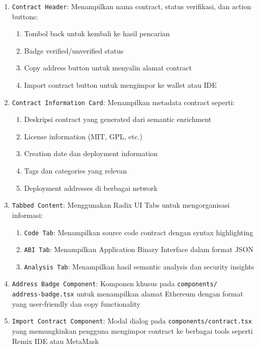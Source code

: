 \begin{enumerate}
	\item \texttt{Contract Header}: Menampilkan nama contract, status verifikasi, dan action buttons:
	      \begin{enumerate}
		      \item Tombol back untuk kembali ke hasil pencarian
		      \item Badge verified/unverified status
		      \item Copy address button untuk menyalin alamat contract
		      \item Import contract button untuk mengimpor ke wallet atau IDE
	      \end{enumerate}
	\item \texttt{Contract Information Card}: Menampilkan metadata contract seperti:
	      \begin{enumerate}
		      \item Deskripsi contract yang generated dari semantic enrichment
		      \item License information (MIT, GPL, etc.)
		      \item Creation date dan deployment information
		      \item Tags dan categories yang relevan
		      \item Deployment addresses di berbagai network
	      \end{enumerate}
	\item \texttt{Tabbed Content}: Menggunakan Radix UI Tabs untuk mengorganisasi informasi:
	      \begin{enumerate}
		      \item \texttt{Code Tab}: Menampilkan source code contract dengan syntax highlighting
		      \item \texttt{ABI Tab}: Menampilkan Application Binary Interface dalam format JSON
		      \item \texttt{Analysis Tab}: Menampilkan hasil semantic analysis dan security insights
	      \end{enumerate}
	\item \texttt{Address Badge Component}: Komponen khusus pada \texttt{components/\\address-badge.tsx} untuk menampilkan alamat Ethereum dengan format yang user-friendly dan copy functionality
	\item \texttt{Import Contract Component}: Modal dialog pada \texttt{components/\-contract.tsx} yang memungkinkan pengguna mengimpor contract ke berbagai tools seperti Remix IDE atau MetaMask
\end{enumerate}

